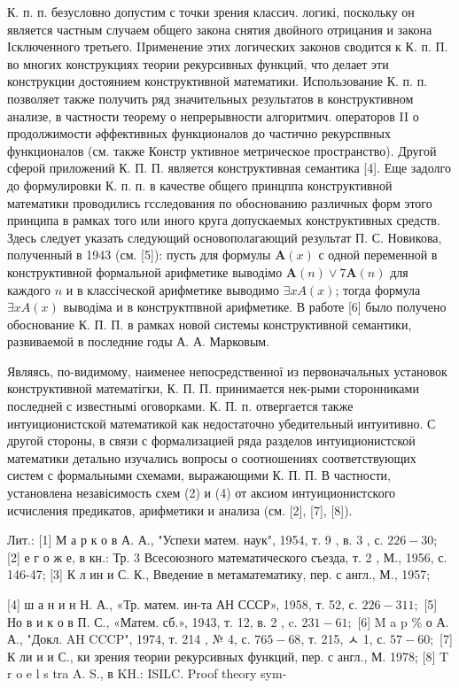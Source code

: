 \documentclass[10pt]{article}
\begin{document}
К. п. п. безусловно допустим с точки зрения классич. логикі, поскольку он является частным случаем общего закона снятия двойного отрицания и закона Ісключенного третьего. IIрименение этих логических законов сводится к К. п. П. во многих конструкциях теории рекурсивных функций, что делает эти конструкции достоянием конструктивной математики. Использование К. п. п. позволяет также получить ряд значительных результатов в конструктивном анализе, в частности теорему о непрерывности алгоритмич. операторов II о продолжимости әффективных функционалов до частично рекурспвных функционалов (см. также Констр уктивное метрическое пространство). Другой сферой приложений К. П. П. является конструктивная семантика [4]. Еще задолго до формулировки К. п. п. в качестве общего принцппа конструктивной математики проводились гсследования по обоснованию различных форм этого принципа в рамках того или иного круга допускаемых конструктивных средств. Здесь следует указать следующий основополагающий результат П. С. Новикова, полученный в 1943 (см. [5]): пусть для формулы $\boldsymbol{A}(x)$ с одной переменной в конструктивной формальной арифметике выводімо $\boldsymbol{A}(n) \vee 7 \boldsymbol{A}(n)$ для каждого $n$ и в классіческой арифметике выводимо $\exists x A(x)$; тогда формула $\exists x A(x)$ выводіма и в конструктпвной арифметике. В работе [6] было получено обоснование К. П. П. в рамках новой системы конструктивной семантики, развиваемой в последние годы А. А. Марковым.



Являясь, по-видимому, наименее непосредственної из первоначальных установок конструктивной математігки, К. П. П. принимается нек-рыми сторонниками последней с известнымі оговорками. К. П. п. отвергается также интуиционистской математикой как недостаточно убедительный интуитивно. С другой стороны, в связи с формализацией ряда разделов интуиционистскоӥ математики детально изучались вопросы о соотношениях соответствующих систем с формальными схемами, выражающими К. П. П. В частности, установлена незавісимость схем (2) и (4) от аксиом интуиционистского исчисления предикатов, арифметики и анализа (см. [2], [7], [8]).



Лит.: [1] М а р к о в А. А., "Успехи матем. наук", 1954, т. 9 , в. 3 , с. $226-30$; [2] е г о ж е, в кн.: Тр. 3 Всесоюзного математического съезда, т. 2 , М., 1956, с. 146-47; [3] К л ин и С. К., Введение в метаматематику, пер. с англ., М., 1957;

[4] ш а н и н Н. А., «Тр. матем. ин-та АН СССР», 1958, т. 52, с. $226-311 ;$ [5] Но в и к о в П. С., «Матем. сб.», 1943, т. 12, в. 2 , c. $231-61 ;$ [6] M a p \% о А. А., "Докл. AH CCCP", 1974, т. 214 , № 4, с. $765-68$, т. 215, ㅅ 1, с. $57-60 ;$ [7] К ли и и С., ки зрения теории рекурсивных функций, пер. с англ., М. 1978; [8] T r o e l s tra A. S., в KH.: ISILC. Proof theory sym-
\end{document}
